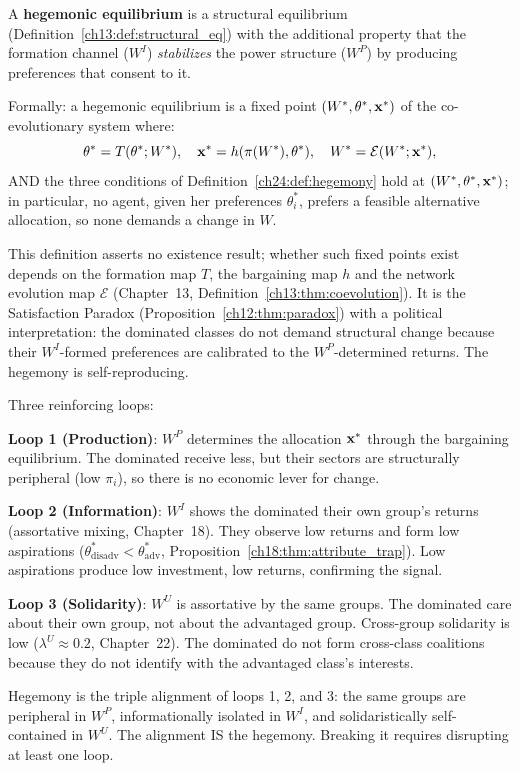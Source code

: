 \documentclass[../structural_economics_book.tex]{subfiles}
\begin{document}
\begin{definition}\label{ch24:thm:hegemony}
A \textbf{hegemonic equilibrium} is a structural equilibrium (Definition~\ref{ch13:def:structural_eq}) with the additional property that the formation channel ($W^I$) \textit{stabilizes} the power structure ($W^P$) by producing preferences that consent to it.

Formally: a hegemonic equilibrium is a fixed point $(W^*, \theta^*, \mathbf{x}^*)$ of the co-evolutionary system where:
\begin{equation}\label{ch24:eq:hegemony}
\theta^* = T(\theta^*; W^*), \quad \mathbf{x}^* = h(\pi(W^*), \theta^*), \quad W^* = \mathcal{E}(W^*; \mathbf{x}^*),
\end{equation}
AND the three conditions of Definition~\ref{ch24:def:hegemony} hold at $(W^*, \theta^*, \mathbf{x}^*)$; in particular, no agent, given her preferences $\theta_i^*$, prefers a feasible alternative allocation, so none demands a change in $W$.

This definition asserts no existence result; whether such fixed points exist depends on the formation map $T$, the bargaining map $h$ and the network evolution map $\mathcal{E}$ (Chapter~13, Definition~\ref{ch13:thm:coevolution}). It is the Satisfaction Paradox (Proposition~\ref{ch12:thm:paradox}) with a political interpretation: the dominated classes do not demand structural change because their $W^I$-formed preferences are calibrated to the $W^P$-determined returns. The hegemony is self-reproducing.
\end{definition}

\begin{intuition}
Three reinforcing loops:

\textbf{Loop 1 (Production)}: $W^P$ determines the allocation $\mathbf{x}^*$ through the bargaining equilibrium. The dominated receive less, but their sectors are structurally peripheral (low $\pi_i$), so there is no economic lever for change.

\textbf{Loop 2 (Information)}: $W^I$ shows the dominated their own group's returns (assortative mixing, Chapter~18). They observe low returns and form low aspirations ($\theta^*_{\text{disadv}} < \theta^*_{\text{adv}}$, Proposition~\ref{ch18:thm:attribute_trap}). Low aspirations produce low investment, low returns, confirming the signal.

\textbf{Loop 3 (Solidarity)}: $W^U$ is assortative by the same groups. The dominated care about their own group, not about the advantaged group. Cross-group solidarity is low ($\lambda^U \approx 0.2$, Chapter~22). The dominated do not form cross-class coalitions because they do not identify with the advantaged class's interests.

Hegemony is the triple alignment of loops 1, 2, and 3: the same groups are peripheral in $W^P$, informationally isolated in $W^I$, and solidaristically self-contained in $W^U$. The alignment IS the hegemony. Breaking it requires disrupting at least one loop.
\end{intuition}
\end{document}
